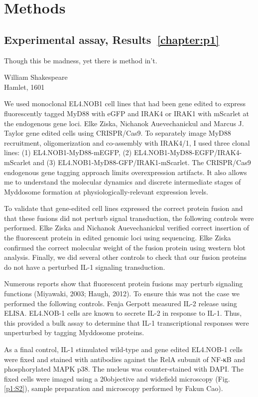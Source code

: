 \part{Methods}
\chapter{Experimental assay, Results~\ref{chapter:p1}}
\label{chapter:assay_v1}
\epigraph{Though this be madness, yet there is method in't.}{William Shakespeare\\Hamlet, 1601}
We used monoclonal EL4.NOB1 cell lines that had been gene edited to express fluorescently tagged MyD88 with eGFP and IRAK4 or IRAK1 with mScarlet at the endogenous gene loci. Elke Ziska, Nichanok Auevechanickul and Marcus J. Taylor gene edited cells using CRISPR/Cas9. To separately image MyD88 recruitment, oligomerization and co-assembly with IRAK4/1, I used three clonal lines: (1) EL4.NOB1-MyD88-mEGFP, (2) EL4.NOB1-MyD88-EGFP/IRAK4-mScarlet and (3) EL4.NOB1-MyD88-GFP/IRAK1-mScarlet. The CRISPR/Cas9 endogenous gene tagging approach limits overexpression artifacts. It also allows me to understand the molecular dynamics and discrete intermediate stages of Myddosome formation at physiologically-relevant expression levels.

To validate that gene-edited cell lines expressed the correct protein fusion and that these fusions did not perturb signal transduction, the following controls were performed. Elke Ziska and Nichanok Auevechanickul verified correct insertion of the fluorescent protein in edited genomic loci using sequencing. Elke Ziska confirmed the correct molecular weight of the fusion protein using western blot analysis. Finally, we did several other controls to check that our fusion proteins do not have a perturbed IL-1 signaling transduction.

Numerous reports show that fluorescent protein fusions may perturb signaling functions (Miyawaki, 2003; Haugh, 2012). To ensure this was not the case we performed the following controls. Fenja Gerpott measured IL-2 release using ELISA. EL4.NOB-1 cells are known to secrete IL-2 in response to IL-1. Thus, this provided a bulk assay to determine that IL-1 transcriptional responses were unperturbed by tagging Myddosome proteins.

As a final control, IL-1 stimulated wild-type and gene edited EL4.NOB-1 cells were fixed and stained with antibodies against the RelA subunit of NF-κB and phosphorylated MAPK p38. The nucleus was counter-stained with DAPI. The fixed cells were imaged using a 20\times objective and widefield microscopy (Fig. \ref{p1:S2}), sample preparation and microscopy performed by Fakun Cao).


